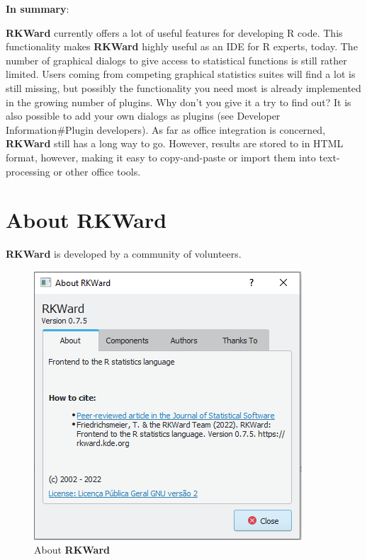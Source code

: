 \documentclass[
  letterpaper,
  DIV=11,
  numbers=noendperiod]{scrreprt}
\begin{document}
\textbf{In summary}:

\textbf{RKWard} currently offers a lot of useful features for developing
R code. This functionality makes \textbf{RKWard} highly useful as an IDE
for R experts, today. The number of graphical dialogs to give access to
statistical functions is still rather limited. Users coming from
competing graphical statistics suites will find a lot is still missing,
but possibly the functionality you need most is already implemented in
the growing number of plugins. Why don't you give it a try to find out?
It is also possible to add your own dialogs as plugins (see Developer
Information\#Plugin developers). As far as office integration is
concerned, \textbf{RKWard} still has a long way to go. However, results
are stored to in HTML format, however, making it easy to copy-and-paste
or import them into text-processing or other office tools.

\hypertarget{about-rkward-1}{%
\section{\texorpdfstring{About
\textbf{RKWard}}{About RKWard}}\label{about-rkward-1}}

\textbf{RKWard} is developed by a community of volunteers.

\begin{figure}

{\centering \includegraphics{./images/about_rkward.png}

}

\caption{About \textbf{RKWard}}

\end{figure}
\end{document}
